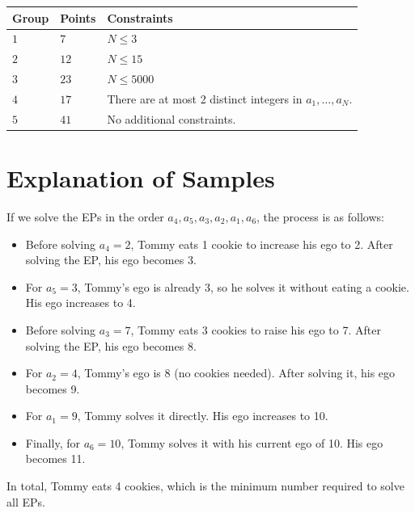 \noindent
\begin{tabular}{| l | l | p{12cm} |}
  \hline
  \textbf{Group} & \textbf{Points} & \textbf{Constraints} \\ \hline
  $1$    & $7$        & $N \leq 3$ \\ \hline
  $2$    & $12$       & $N \leq 15$ \\ \hline
  $3$    & $23$       & $N \leq 5000$ \\ \hline
  $4$    & $17$       & There are at most 2 distinct integers in $a_1, \dots, a_N$. \\ \hline
  $5$    & $41$       & No additional constraints. \\ \hline
\end{tabular}

\section*{Explanation of Samples}
If we solve the EPs in the order $a_4, a_5, a_3, a_2, a_1, a_6$, the process is as follows:  
\begin{itemize}
 \item Before solving $a_4 = 2$, Tommy eats 1 cookie to increase his ego to 2. After solving the EP, his ego becomes 3.
 \item For $a_5 = 3$, Tommy's ego is already 3, so he solves it without eating a cookie. His ego increases to 4.
 \item Before solving $a_3 = 7$, Tommy eats 3 cookies to raise his ego to 7. After solving the EP, his ego becomes 8.
 \item For $a_2 = 4$, Tommy's ego is 8 (no cookies needed). After solving it, his ego becomes 9.
 \item For $a_1 = 9$, Tommy solves it directly. His ego increases to 10.
 \item Finally, for $a_6 = 10$, Tommy solves it with his current ego of 10. His ego becomes 11.
\end{itemize}

In total, Tommy eats 4 cookies, which is the minimum number required to solve all EPs.